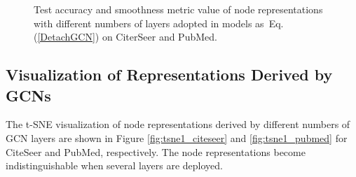 \documentclass[sigconf]{acmart}
\begin{document}
\begin{figure}[h]
\centering
{}
\caption{Test accuracy and smoothness metric value of node representations with different numbers of layers adopted in models as~Eq.(\ref{DetachGCN}) on CiterSeer and PubMed.}
\label{fig:detachgcn_citeseer_pubmed}
\end{figure}


\subsection{Visualization of Representations Derived by GCNs}\label{Sec:visual_citeseer_pubmed_gcn}

The t-SNE visualization of node representations derived by different numbers of GCN layers are shown in Figure \ref{fig:tsne1_citeseer} and \ref{fig:tsne1_pubmed} for CiteSeer and PubMed, respectively. The node representations become indistinguishable when several layers are deployed.


\begin{figure*}
\centering
{}
\caption{t-SNE visualization of node representations derived by different numbers of GCN layers on CiteSeer. Colors represent node classes.}
\label{fig:tsne1_citeseer}
\end{figure*}
\end{document}
